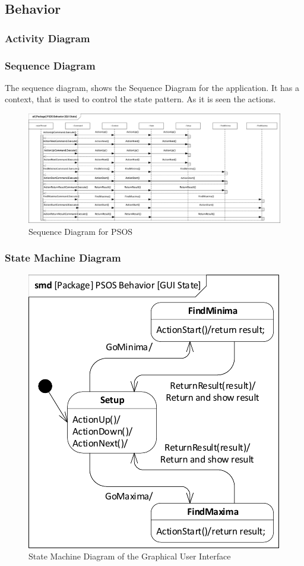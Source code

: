 \subsection{Behavior} \label{requirementspecification:Behavior}

\subsubsection{Activity Diagram}

\subsubsection{Sequence Diagram}
The sequence diagram, shows the Sequence Diagram for the application.
It has a context, that is used to control the state pattern. As it is seen the actions.

\begin{figure}[H]
	\centering
	\includegraphics[width=1\linewidth]{diagram/sd_psos}
	\caption{Sequence Diagram for PSOS}
	\label{fig:sdpsos}
\end{figure}



\subsubsection{State Machine Diagram}

\begin{figure}[H]
	\centering
	\includegraphics[width=0.7\linewidth]{diagram/smd_gui_state}
	\caption{State Machine Diagram of the Graphical User Interface}
	\label{fig:smdguistate}
\end{figure}
